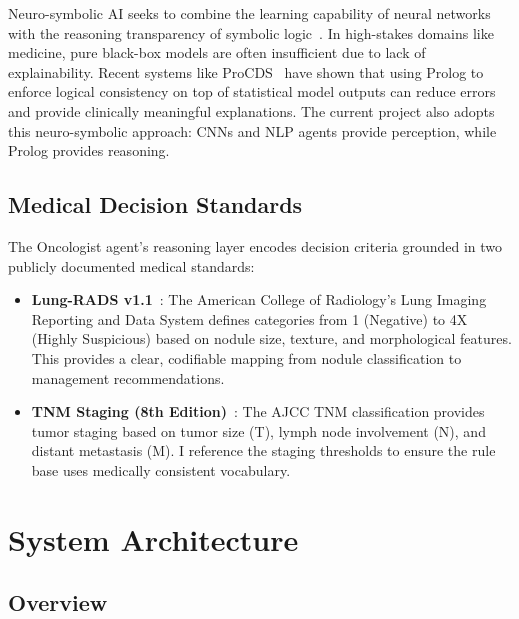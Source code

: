 \documentclass[12pt]{article}
\begin{document}
Neuro-symbolic AI seeks to combine the learning capability of neural networks with the reasoning transparency of symbolic logic~\cite{garcez2019neurosymbolic}. In high-stakes domains like medicine, pure black-box models are often insufficient due to lack of explainability. Recent systems like ProCDS~\cite{tan2025procds} have shown that using Prolog to enforce logical consistency on top of statistical model outputs can reduce errors and provide clinically meaningful explanations. The current project also adopts this neuro-symbolic approach: CNNs and NLP agents provide perception, while Prolog provides reasoning.

\subsection{Medical Decision Standards}
\label{subsec:medical-standards}

The Oncologist agent's reasoning layer encodes decision criteria grounded in two publicly documented medical standards:

\begin{itemize}
    \item \textbf{Lung-RADS v1.1}~\cite{acr2019lungrads}: The American College of Radiology's Lung Imaging Reporting and Data System defines categories from 1 (Negative) to 4X (Highly Suspicious) based on nodule size, texture, and morphological features. This provides a clear, codifiable mapping from nodule classification to management recommendations.
    \item \textbf{TNM Staging (8th Edition)}~\cite{ajcc2017stagingmanual8}: The AJCC TNM classification provides tumor staging based on tumor size (T), lymph node involvement (N), and distant metastasis (M). I reference the staging thresholds to ensure the rule base uses medically consistent vocabulary.
\end{itemize}


\section{System Architecture}
\label{sec:architecture}

\subsection{Overview}
\label{subsec:arch-overview}
\end{document}
